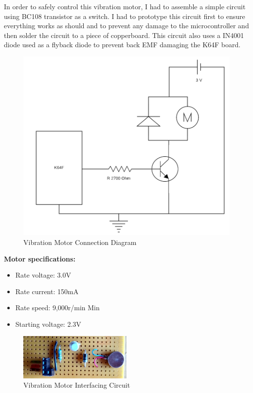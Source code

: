 \documentclass[12pt,a4paper]{article}
\begin{document}
        In order to safely control this vibration motor, I had to assemble a simple circuit using BC108 transistor as a switch. I had to prototype this circuit first to ensure everything works as should and to prevent any damage to the microcontroller and then solder the circuit to a piece of copperboard. This circuit also uses a IN4001 diode used as a flyback diode to prevent back EMF damaging the K64F board.\\
        
		\begin{figure}[h]
			\centering
			\includegraphics[scale=0.3]{motor_diag1.png}
			\caption{Vibration Motor Connection Diagram}
			\label{fig:vibMotorConnDiag}
		\end{figure}
        
		{\bfseries Motor specifications:}
		\begin{itemize}
			\item Rate voltage: 3.0V
			\item Rate current: 150mA
			\item Rate speed: 9,000r/min Min
			\item Starting voltage: 2.3V
		\end{itemize}
		
        \begin{figure}[h]
         \centering
         \includegraphics[width=0.5\textwidth]{circuit1.jpg}
         \caption{Vibration Motor Interfacing Circuit}
         \label{fig:vibMotIC}
        \end{figure}
        \newpage
		
\end{document}
